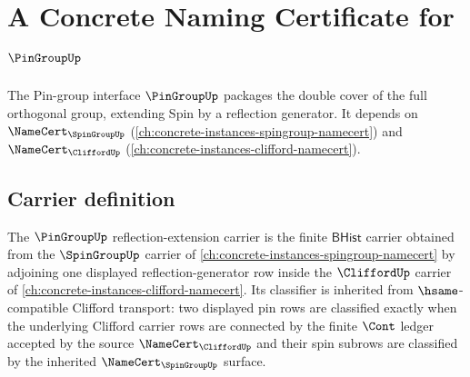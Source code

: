 \chapter{A Concrete Naming Certificate for $\PinGroupUp$}
\label{ch:concrete-instances-pingroup-namecert}

The Pin-group interface $\PinGroupUp$ packages the double cover of the full orthogonal group, extending Spin by a reflection generator. It depends on $\NameCert_{\SpinGroupUp}$ (\autoref{ch:concrete-instances-spingroup-namecert}) and $\NameCert_{\CliffordUp}$ (\autoref{ch:concrete-instances-clifford-namecert}).

\section{Carrier definition}
\label{sec:pingroup-carrier}

\begin{definition}
\label{def:pingroup-reflection-extension-carrier}
The $\PinGroupUp$ reflection-extension carrier is the finite $\mathsf{BHist}$
carrier obtained from the $\SpinGroupUp$ carrier of
\autoref{ch:concrete-instances-spingroup-namecert} by adjoining one displayed
reflection-generator row inside the $\CliffordUp$ carrier of
\autoref{ch:concrete-instances-clifford-namecert}.  Its classifier is inherited
from $\hsame$-compatible Clifford transport: two displayed pin rows are
classified exactly when the underlying Clifford carrier rows are connected by
the finite $\Cont$ ledger accepted by the source $\NameCert_{\CliffordUp}$ and
their spin subrows are classified by the inherited $\NameCert_{\SpinGroupUp}$
surface.
\end{definition}

